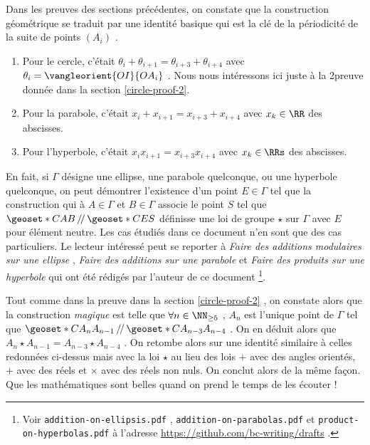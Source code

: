 Dans les preuves des sections précédentes, on constate que la construction géométrique se traduit par une identité basique qui est la clé de la périodicité de la suite de points $\left( A_i \right)$ . 
\begin{enumerate}
	\item Pour le cercle, c'était $\theta_i + \theta_{i+1} = \theta_{i+3} + \theta_{i+4}$ avec $\theta_i = \vangleorient{OI}{OA_i}$ . Nous nous intéressons ici juste à la 2\ieme preuve donnée dans la section \ref{circle-proof-2}. 

	\item Pour la parabole, c'était $x_i + x_{i+1} = x_{i+3} + x_{i+4}$ avec $x_k \in \RR$ des abscisses. 

	\item Pour l'hyperbole, c'était  $x_i x_{i+1} = x_{i+3} x_{i+4}$ avec $x_k \in \RRs$ des abscisses.
\end{enumerate}


\medskip


En fait, si $\Gamma$ désigne une ellipse, une parabole quelconque, ou une hyperbole quelconque, on peut démontrer l'existence d'un point $E \in \Gamma$ tel que la construction qui à $A \in \Gamma$ et $B \in \Gamma$ associe le point $S$ tel que $\geoset*{C}{AB} \,/\!/\, \geoset*{C}{ES}$ définisse une loi de groupe $\star$ sur $\Gamma$ avec $E$ pour élément neutre. 
Les cas étudiés dans ce document n'en sont que des cas particuliers. 
Le lecteur intéressé peut se reporter à  
\emph{\og Faire des additions modulaires sur une ellipse \fg} ,
\emph{\og Faire des additions sur une parabole \fg} 
et
\emph{\og Faire des produits sur une hyperbole \fg}
qui ont été rédigés par l'auteur de ce document
\footnote{
	Voir \texttt{addition-on-ellipsis.pdf} , \texttt{addition-on-parabolas.pdf}  et \texttt{product-on-hyperbolas.pdf}  à l'adresse \url{https://github.com/bc-writing/drafts} .
}.


\medskip


Tout comme dans la preuve dans la section \ref{circle-proof-2} , on constate alors que la construction \emph{\og magique \fg} est telle que $\forall n \in \NN_{\geq 5}$ , $A_{n}$ est l'unique point de $\Gamma$ tel que $\geoset*{C}{A_{n} A_{n-1}} \,/\!/\, \geoset*{C}{A_{n-3} A_{n-4}}$ . On en déduit alors que $A_{n} \star A_{n-1} = A_{n-3} \star A_{n-4}$ . On retombe alors sur une identité similaire à celles redonnées ci-dessus mais avec la loi $\star$ au lieu des lois $+$ avec des angles orientés, $+$ avec des réels et $\times$ avec des réels non nuls. On conclut alors de la même façon. Que les mathématiques sont belles quand on prend le temps de les écouter !
